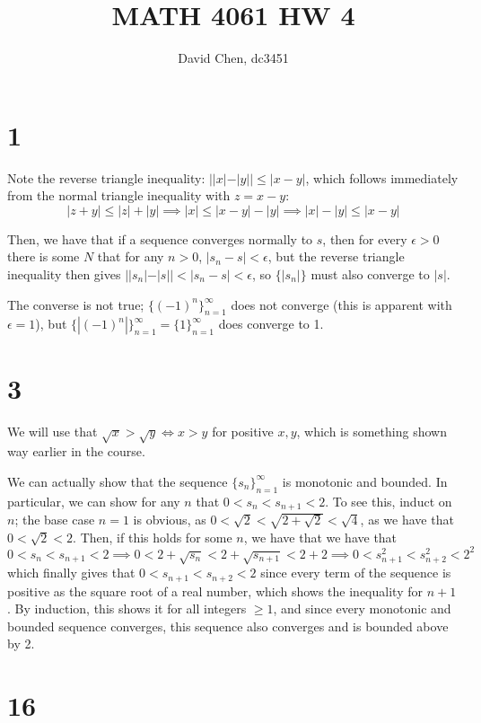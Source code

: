\documentclass[12pt,letterpaper]{article}
\title{MATH 4061 HW 4}
\author{David Chen, dc3451}
\theoremstyle{definition}
\begin{document}
\maketitle

\section*{1}

Note the reverse triangle inequality: $||x| - |y|| \leq |x - y|$, which follows immediately from the normal triangle inequality with $z = x - y$:
\[
  |z + y| \leq |z| + |y| \implies |x| \leq |x-y| - |y| \implies |x| - |y| \leq |x-y|
\]

Then, we have that if a sequence converges normally to $s$, then for every $\epsilon > 0$ there is some $N$ that for any $n > 0$, $|s_{n} - s| < \epsilon$, but the reverse triangle inequality then gives $||s_{n}| - |s|| < |s_{n} - s| < \epsilon$, so $\{|s_{n}|\}$ must also converge to $|s|$.

The converse is not true; $\{(-1)^{n}\}_{n=1}^{\infty}$ does not converge (this is apparent with $\epsilon = 1$), but $\{|(-1)^{n}|\}_{n=1}^{\infty} = \{1\}_{n=1}^{\infty}$ does converge to 1.

\section*{3}

We will use that $\sqrt{x} > \sqrt{y} \iff x > y$ for positive $x,y$, which is something shown way earlier in the course.

We can actually show that the sequence $\{s_{n}\}_{n=1}^{\infty}$ is monotonic and bounded. In particular, we can show for any $n$ that $0 < s_{n} < s_{n+1} < 2$. To see this, induct on $n$; the base case $n = 1$ is obvious, as $0 < \sqrt{2} < \sqrt{2 + \sqrt{2}} < \sqrt{4}$, as we have that $0 < \sqrt{2} < 2$. Then, if this holds for some $n$, we have that we have that
\[
  0 < s_{n} < s_{n+1} < 2 \implies 0 < 2 + \sqrt{s_{n}} < 2 + \sqrt{s_{n+1}} < 2 + 2 \implies 0 < s_{n+1}^{2} < s_{n+2}^{2} < 2^{2}
\]
which finally gives that $0 < s_{n+1} < s_{n+2} < 2$ since every term of the sequence is positive as the square root of a real number, which shows the inequality for $n+1$. By induction, this shows it for all integers $\geq 1$, and since every monotonic and bounded sequence converges, this sequence also converges and is bounded above by 2.

\section*{16}
\end{document}
